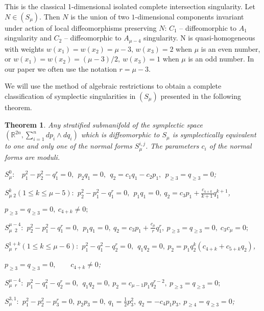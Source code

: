 \documentclass{amsart}
\newtheorem{thm}{Theorem}[section]
\theoremstyle{definition}
\numberwithin{equation}{section}
\begin{document}
This is the classical 1-dimensional isolated complete intersection singularity.  Let $N\in (S_{\mu})$. Then $N$ is the union of two $1$-dimensional components invariant under action of local diffeomorphisms preserving $N$: $C_1$ -- diffeomorphic to $A_1$ singularity and $C_2$ -- diffeomorphic to $A_{\mu -4}$ singularity. N is quasi-homogeneous with weights $w(x_1)=w(x_2)=\mu-3,\, w(x_3)=2$ when $\mu$ is an even number, or $w(x_1)=w(x_2)=(\mu-3)/2,\ w(x_3)=1$ when $\mu$ is an odd number. In our paper we often use the notation $r=\mu-3$.

\medskip

 We will use the method of algebraic restrictions to obtain a complete classification of
symplectic singularities in $(S_{\mu})$ presented in the following theorem.

\begin{thm}\label{s-main}
Any stratified submanifold of the symplectic space $(\mathbb
R^{2n},\sum_{i=1}^n dp_i \wedge dq_i)$ which is diffeomorphic to
$S_{\mu}$ is symplectically equivalent to one and only one of the
normal forms $S_{\mu}^{i,j}$. The
parameters $c_i$ of the normal forms are moduli.

\smallskip

\noindent $S_{\mu}^0:$ \ $p_1^2 - p_2^2 - q_1^r = 0, \ \ p_2q_1 = 0, \ \
q_2 = c_1q_1 - c_2p_1, \ \ p_{\ge 3} = q_{\ge 3} = 0$;

\smallskip

\noindent $S_{\mu\;2}^{k} (1\leq k\leq\mu-5):$  $p_2^2-p_1^2-q_1^r=0, \ \ p_1q_1=0,  \
q_2=c_3p_1+\frac{c_{4+k}}{k+1}q_1^{k+1}$, \par  $p_{\ge 3}=q_{\ge 3}=0, \ c_{4+k}\ne 0;$

\smallskip

\noindent $S_{\mu\;\;2}^{\mu-4}:$  $p_2^2-p_1^2-q_1^r=0, \ \ p_1q_1=0,  \
q_2=c_3p_1+\frac{c_{\mu}}{r}q_1^{r}, \  p_{\ge 3}=q_{\ge 3}=0, \; c_3c_{\mu}=0;$

\smallskip

\noindent $S_{\mu\;\;r}^{1+k} (1\leq k\leq\mu-6):$  $p_1^2-q_1^2-q_2^r=0, \ \ q_1q_2=0,  \ p_2=p_1q_2^{k}(c_{4+k}+c_{5+k}q_2)$, \par  $p_{\ge 3}=q_{\ge 3}=0,$
\ $\; \; \; \; c_{4+k}\ne 0$;

\smallskip

\noindent $S_{\mu\;\;r}^{\mu-4}:$  $p_1^2-q_1^2-q_2^r=0, \ \ q_1q_2=0,  \ p_2=c_{\mu-1}p_1q_2^{r-2}, \  p_{\ge 3}=q_{\ge 3}=0;$

\smallskip

\noindent $S_{\mu}^{3,1}:$  $p_1^2-p_2^2-p_3^r=0, \  p_2p_3=0,  \
q_1=\frac{1}{2}p_3^{2},\ q_2=-c_4p_1p_3,  \  p_{\ge 4}=q_{\ge 3}=0$;


\end{thm}
\end{document}
